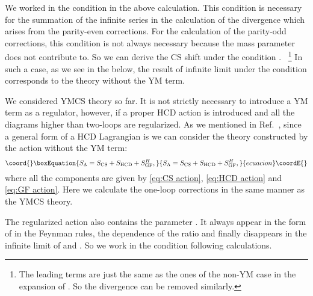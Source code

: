 \documentclass[a4paper,12pt]{article}
\begin{document}
%
We worked in the condition \coordHE{} in the above calculation.
%
This condition is necessary for the summation of the infinite series
in the calculation of the divergence
which arises from the parity-even corrections.
%
For the calculation of the parity-odd corrections,
this condition is not always necessary
because the mass parameter \coordHE{} does not contribute to.
%
So we can derive the CS shift under the condition \myHighlight{$\mu \gg \Lambda$}\coordHE{}.%
~\footnote{%
  The leading terms are just the same as the ones of the non-YM case
  in the expansion of \myHighlight{$\mu$}\coordHE{}.
  So the divergence can be removed similarly.
  }
%
In such a case, as we see in the below,
the result of infinite limit
under the condition \myHighlight{$\mu /\Lambda \rightarrow \infty$}\coordHE{}
corresponds to the theory without the YM term.



\label{sec:CS+p-even HCD}

We considered YMCS theory so far.
%
It is not strictly necessary to introduce a YM term as a regulator, however,
if a proper HCD action is introduced and
all the diagrams higher than two-loops are regularized.
%
As we mentioned in Ref.~\cite{Nittoh:1998ey},
since a general form of a HCD Lagrangian is \coordHE{}
we can consider the theory constructed by the action
without the YM term:
%
\begin{equation}\coord{}\boxEquation{
S_\Lambda = S_\mathrm{CS}  + S_\mathrm{HCD} + S_\mathrm{GF}^H,
}{
S_\Lambda = S_\mathrm{CS}  + S_\mathrm{HCD} + S_\mathrm{GF}^H,
}{ecuacion}\coordE{}\end{equation}
%
where all the components are given by
\eqref{eq:CS action}, \eqref{eq:HCD action} and \eqref{eq:GF action}.
%
Here we calculate the one-loop corrections
in the same manner as the YMCS theory.
%

The regularized action also contains the parameter \myHighlight{$\mu$}\coordHE{}.
%
It always appear in the form of \coordHE{} in the Feynman rules,
the dependence of the ratio \myHighlight{$\mu$}\coordHE{} and \myHighlight{$\Lambda$}\coordHE{}
finally disappears in the infinite limit of \myHighlight{$\mu$}\coordHE{} and \myHighlight{$\Lambda$}\coordHE{}.
%
So we work in the condition \myHighlight{$\mu = \Lambda$}\coordHE{} following calculations.
\end{document}
